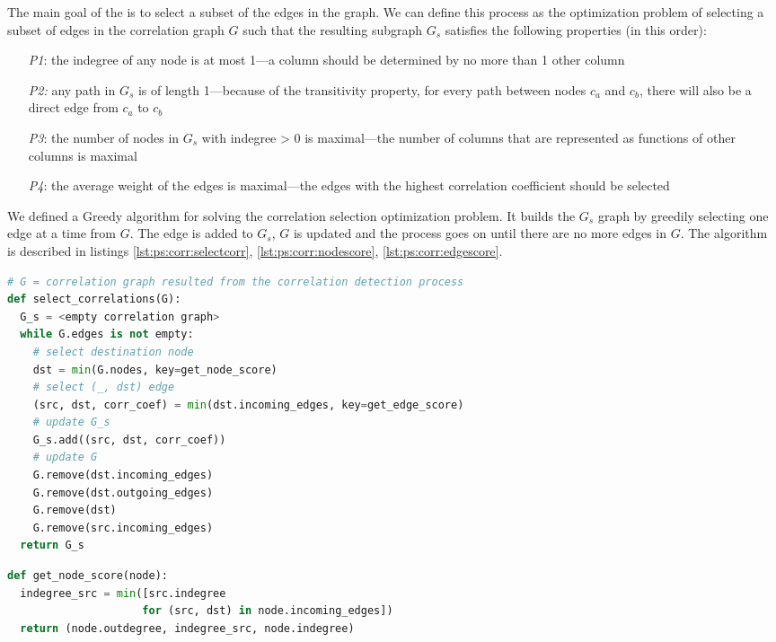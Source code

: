 The main goal of the  is to select a subset of the edges in the graph. We can define this process as the optimization problem of selecting a subset of edges in the correlation graph \(G\) such that the resulting subgraph \(G_{s}\) satisfies the following properties (in this order):
\begin{itemize}
    \item[\textit{P1}:] the indegree of any node is at most 1---a column should be determined by no more than 1 other column
    \item[\textit{P2:}] any path in \(G_{s}\) is of length 1---because of the transitivity property, for every path between nodes \(c_{a}\) and \(c_{b}\), there will also be a direct edge from \(c_{a}\) to \(c_{b}\)
    \item[\textit{P3}:] the number of nodes in \(G_{s}\) with indegree > 0 is maximal---the number of columns that are represented as functions of other columns is maximal
    \item[\textit{P4}:] the average weight of the edges is maximal---the edges with the highest correlation coefficient should be selected
\end{itemize}

We defined a Greedy algorithm for solving the correlation selection optimization problem. It builds the \(G_{s}\) graph by greedily selecting one edge at a time from \(G\). The edge is added to \(G_{s}\), \(G\) is updated and the process goes on until there are no more edges in \(G\). The algorithm is described in listings \ref{lst:ps:corr:selectcorr}, \ref{lst:ps:corr:nodescore}, \ref{lst:ps:corr:edgescore}.

\begin{lstlisting}[language=Python,
label={lst:ps:corr:selectcorr},
caption={select\_correlations}]
# G = correlation graph resulted from the correlation detection process
def select_correlations(G):
  G_s = <empty correlation graph>
  while G.edges is not empty:
    # select destination node
    dst = min(G.nodes, key=get_node_score)
    # select (_, dst) edge
    (src, dst, corr_coef) = min(dst.incoming_edges, key=get_edge_score)
    # update G_s
    G_s.add((src, dst, corr_coef))
    # update G
    G.remove(dst.incoming_edges)
    G.remove(dst.outgoing_edges)
    G.remove(dst)
    G.remove(src.incoming_edges)
  return G_s
\end{lstlisting}

\begin{lstlisting}[language=Python,
label={lst:ps:corr:nodescore},
caption={get\_node\_score}]
def get_node_score(node):
  indegree_src = min([src.indegree 
                     for (src, dst) in node.incoming_edges])
  return (node.outdegree, indegree_src, node.indegree)
\end{lstlisting}


